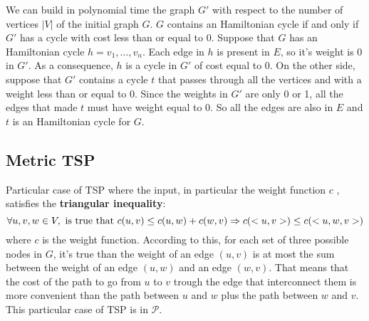 We can build in polynomial time the graph $G'$ with respect to the number of vertices $|V|$ of the initial graph $G$. $G$ contains an Hamiltonian cycle if and only if $G'$ has a cycle with cost less than or equal to 0. Suppose that $G$ has an Hamiltonian cycle $h = v_1, \dots, v_n$. Each edge in $h$ is present in $E$, so it's weight is 0 in $G'$. As a consequence, $h$ is a cycle in $G'$ of cost equal to 0. On the other side, suppose that $G'$ contains a cycle $t$ that passes through all the vertices and with a weight less than or equal to 0. Since the weights in $G'$ are only 0 or 1, all the edges that made $t$ must have weight equal to 0. So all the edges are also in $E$ and $t$ is an Hamiltonian cycle for $G$.

\subsection{Metric TSP}
Particular case of TSP where the input, in particular the weight function $c$ , satisfies the \textbf{triangular inequality}:
\[
\forall u, v, w \in V, \textnormal{ is true that } c(u, v) \le c(u, w) + c(w, v) \Rightarrow
c(<u, v>) \le c(<u, w, v>)
\]
where $c$ is the weight function. According to this, for each set of three possible nodes in $G$, it's true than the weight of an edge $(u, v)$ is at most the sum between the weight of an edge $(u, w)$ and an edge $(w, v)$. That means that the cost of the path to go from $u$ to $v$ trough the edge that interconnect them is more convenient than the path between $u$ and $w$ plus the path between $w$ and $v$. This particular case of TSP is in $\mathcal{P}$.